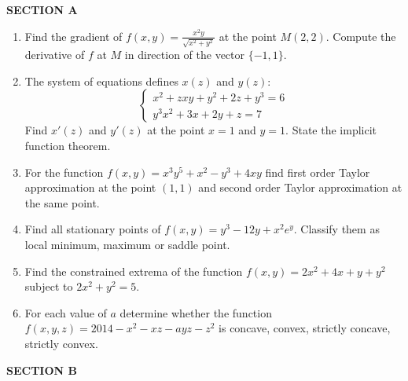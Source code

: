 \documentclass[A4,12pt]{article}
\begin{document}
\newpage

\textbf{SECTION A}

\begin{enumerate}
	\item Find the gradient of $f(x,y) =\frac{x^2y}{\sqrt{x^2+y^2}}$
at the point $M(2,2)$. Compute the derivative of $f$ at $M$ in direction of the vector $\{-1, 1\}$.
	\item The system of equations defines $x(z)$ and $y(z)$:
\begin{equation}
\begin{cases}
x^2+zxy+y^2+2z+y^3=6 \\
y^3x^2+3x+2y+z=7 \nonumber
\end{cases}
\end{equation}
Find $x'(z)$ and $y'(z)$ at the point $x=1$ and $y=1$. State the implicit function theorem.
 \item For the function $f(x,y)=x^3y^5+x^2-y^3+4xy$ find first order Taylor approximation at the point $(1,1)$ and second order Taylor approximation at the same point.
	\item Find all stationary points of $f(x,y) =y^3-12y+x^2e^y$. Classify them as local minimum, maximum or saddle point.
	\item Find the constrained extrema of the function $f(x,y)=2x^2+4x+y+y^2$ subject to $2x^2+y^2=5$.
	\item  For each value of $a$ determine whether the function $f(x,y,z)=2014-x^2-xz-ayz-z^2$ is concave, convex, strictly concave, strictly convex.
\end{enumerate}

\textbf{SECTION B}
\end{document}
